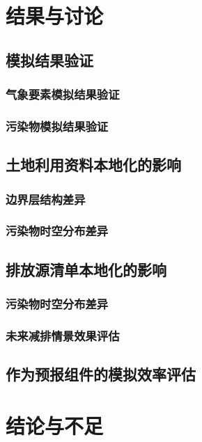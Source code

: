 \documentclass[a4paper]{article}
\begin{document}
\section{结果与讨论}
\subsection{模拟结果验证}
\subsubsection{气象要素模拟结果验证}
\subsubsection{污染物模拟结果验证}
\subsection{土地利用资料本地化的影响}
\subsubsection{边界层结构差异}
\subsubsection{污染物时空分布差异}
\subsection{排放源清单本地化的影响}
\subsubsection{污染物时空分布差异}
\subsubsection{未来减排情景效果评估}
\subsection{作为预报组件的模拟效率评估}
\section{结论与不足}
\end{document}
